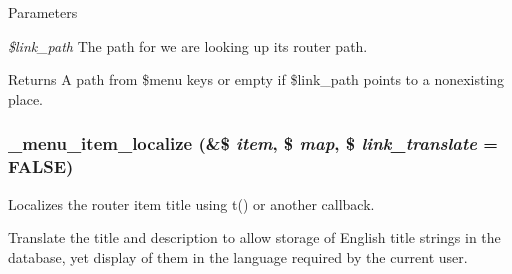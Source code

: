 \begin{DoxyParams}{Parameters}
\item[{\em \$link\_\-path}]The path for we are looking up its router path.\end{DoxyParams}
\begin{DoxyReturn}{Returns}
A path from \$menu keys or empty if \$link\_\-path points to a nonexisting place. 
\end{DoxyReturn}
\hypertarget{group__menu_ga3b0c0f37db66372ac4e90afa35b191e9}{
\subsubsection[{\_\-menu\_\-item\_\-localize}]{\setlength{\rightskip}{0pt plus 5cm}\_\-menu\_\-item\_\-localize (\&\$ {\em item}, \/  \$ {\em map}, \/  \$ {\em link\_\-translate} = {\ttfamily FALSE})}}
\label{group__menu_ga3b0c0f37db66372ac4e90afa35b191e9}
Localizes the router item title using t() or another callback.

Translate the title and description to allow storage of English title strings in the database, yet display of them in the language required by the current user.



